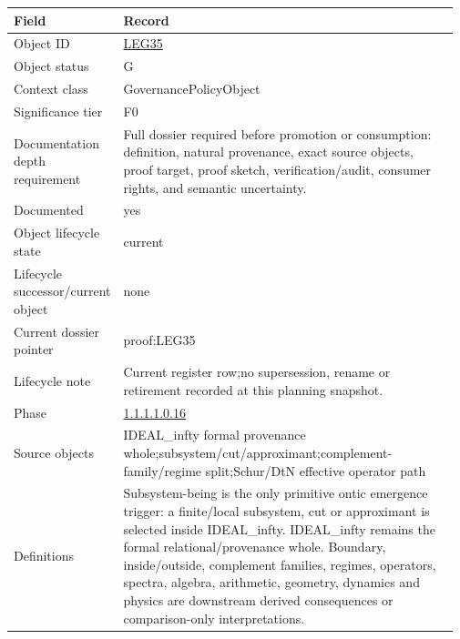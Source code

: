 \begin{longtable}{L{0.16\linewidth} L{0.81\linewidth}}
\hline
\textbf{Field} & \textbf{Record}\\
\hline
Object ID & \hyperlink{object-row-LEG35}{LEG35}\\
\hline\addlinespace[0.20em]
Object status & G\\
\hline\addlinespace[0.20em]
Context class & GovernancePolicyObject\\
\hline\addlinespace[0.20em]
Significance tier & F0\\
\hline\addlinespace[0.20em]
Documentation depth requirement & Full dossier required before promotion or consumption: definition, natural provenance, exact source objects, proof target, proof sketch, verification/\allowbreak{}audit, consumer rights, and semantic uncertainty.\\
\hline\addlinespace[0.20em]
Documented & yes\\
\hline\addlinespace[0.20em]
Object lifecycle state & current\\
\hline\addlinespace[0.20em]
Lifecycle successor/\allowbreak{}current object & none\\
\hline\addlinespace[0.20em]
Current dossier pointer & proof:LEG35\\
\hline\addlinespace[0.20em]
Lifecycle note & Current register row;\newline no supersession, rename or retirement recorded at this planning snapshot.\\
\hline\addlinespace[0.20em]
Phase & \hyperlink{phase-row-1-1-1-1-0-16}{1.1.1.1.0.16}\\
\hline\addlinespace[0.20em]
Source objects & IDEAL\_infty formal provenance whole;\newline subsystem/\allowbreak{}cut/\allowbreak{}approximant;\newline complement-family/\allowbreak{}regime split;\newline Schur/\allowbreak{}DtN effective operator path\\
\hline\addlinespace[0.20em]
Definitions & Subsystem-being is the only primitive ontic emergence trigger: a finite/\allowbreak{}local subsystem, cut or approximant is selected inside IDEAL\_infty. IDEAL\_infty remains the formal relational/\allowbreak{}provenance whole. Boundary, inside/\allowbreak{}outside, complement families, regimes, operators, spectra, algebra, arithmetic, geometry, dynamics and physics are downstream derived consequences or comparison-only interpretations.\\

\end{longtable}
